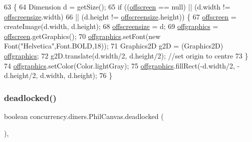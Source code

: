 \begin{DoxyCode}
63                     \{
64         Dimension d = getSize();
65         \textcolor{keywordflow}{if} ((\mbox{\hyperlink{classconcurrency_1_1diners_1_1_phil_canvas_acad40c9dc3eba609d61f21b19292fb59}{offscreen}} == null) || (d.width != \mbox{\hyperlink{classconcurrency_1_1diners_1_1_phil_canvas_a3f984b3894636ddef4df8a8e60f8c418}{offscreensize}}.width)
66                                 || (d.height != \mbox{\hyperlink{classconcurrency_1_1diners_1_1_phil_canvas_a3f984b3894636ddef4df8a8e60f8c418}{offscreensize}}.height)) \{
67             \mbox{\hyperlink{classconcurrency_1_1diners_1_1_phil_canvas_acad40c9dc3eba609d61f21b19292fb59}{offscreen}} = createImage(d.width, d.height);
68             \mbox{\hyperlink{classconcurrency_1_1diners_1_1_phil_canvas_a3f984b3894636ddef4df8a8e60f8c418}{offscreensize}} = d;
69             \mbox{\hyperlink{classconcurrency_1_1diners_1_1_phil_canvas_a8ef774c408aeaad890a9cdb7d5bc6a5a}{offgraphics}} = \mbox{\hyperlink{classconcurrency_1_1diners_1_1_phil_canvas_acad40c9dc3eba609d61f21b19292fb59}{offscreen}}.getGraphics();
70             \mbox{\hyperlink{classconcurrency_1_1diners_1_1_phil_canvas_a8ef774c408aeaad890a9cdb7d5bc6a5a}{offgraphics}}.setFont(\textcolor{keyword}{new} Font(\textcolor{stringliteral}{"Helvetica"},Font.BOLD,18));
71             Graphics2D  g2D = (Graphics2D) \mbox{\hyperlink{classconcurrency_1_1diners_1_1_phil_canvas_a8ef774c408aeaad890a9cdb7d5bc6a5a}{offgraphics}};
72             g2D.translate(d.width/2, d.height/2); \textcolor{comment}{//set origin to centre}
73         \}
74         \mbox{\hyperlink{classconcurrency_1_1diners_1_1_phil_canvas_a8ef774c408aeaad890a9cdb7d5bc6a5a}{offgraphics}}.setColor(Color.lightGray);
75         \mbox{\hyperlink{classconcurrency_1_1diners_1_1_phil_canvas_a8ef774c408aeaad890a9cdb7d5bc6a5a}{offgraphics}}.fillRect(-d.width/2, -d.height/2, d.width, d.height);
76      \}
\end{DoxyCode}
\mbox{\label{classconcurrency_1_1diners_1_1_phil_canvas_a4792fa3037ac30fdc1645047637b861a}} 
\subsubsection{\texorpdfstring{deadlocked()}{deadlocked()}}
{\footnotesize\ttfamily boolean concurrency.\+diners.\+Phil\+Canvas.\+deadlocked (\begin{DoxyParamCaption}{ }\end{DoxyParamCaption})\hspace{0.3cm}{\ttfamily [inline]}, {\ttfamily [package]}}


